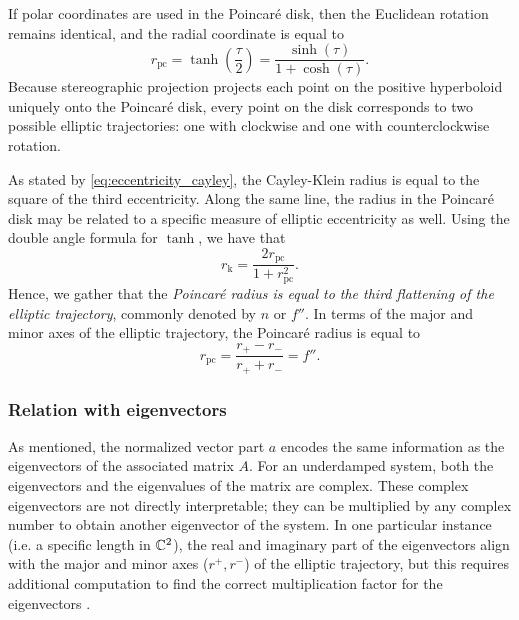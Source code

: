 If polar coordinates are used in the Poincaré disk, then the Euclidean rotation remains identical, and the radial coordinate is equal to
\begin{equation} 
    r_\text{pc} = \tanh(\frac{\tau}{2}) = \frac{\sinh(\tau)}{1 + \cosh(\tau)}. 
\end{equation}
Because stereographic projection projects each point on the positive hyperboloid uniquely onto the Poincaré disk, every point on the disk corresponds to two possible elliptic trajectories: one with clockwise and one with counterclockwise rotation.

As stated by \cref{eq:eccentricity_cayley}, the Cayley-Klein radius is equal to the square of the third eccentricity. Along the same line, the radius in the Poincaré disk may be related to a specific measure of elliptic eccentricity as well. Using the double angle formula for \( \tanh \), we have that
\begin{equation}
     r_\text{k} = \frac{2r_\text{pc}}{1 + r_\text{pc}^2}.
\end{equation}
Hence, we gather that the \emph{Poincaré radius is equal to the third flattening of the elliptic trajectory}, commonly denoted by \(n\) or \(f''\). In terms of the major and minor axes of the elliptic trajectory, the Poincaré radius is equal to
\begin{equation}
     r_\text{pc} = \frac{r_+ - r_-}{r_+ + r_-} = f''.
\end{equation}

\subsubsection{Relation with eigenvectors} 
As mentioned, the normalized vector part \(a\) encodes the same information as the eigenvectors of the associated matrix \(A\). For an underdamped system, both the eigenvectors and the eigenvalues of the matrix are complex. These complex eigenvectors are not directly interpretable; they can be multiplied by any complex number to obtain another eigenvector of the system. In one particular instance (i.e. a specific length in \(\mathbb{C}^2\)), the real and imaginary part of the eigenvectors align with the major and minor axes (\(r^+, r^-\)) of the elliptic trajectory, but this requires additional computation to find the correct multiplication factor for the eigenvectors \cite{Edwards2018}. 

